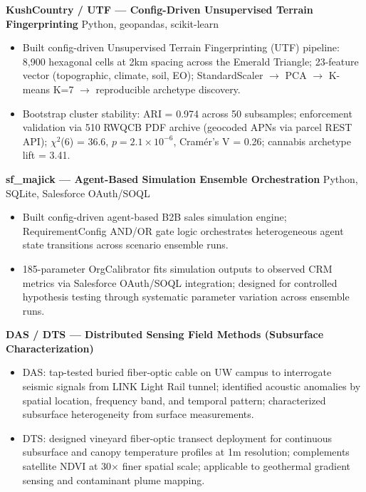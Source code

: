 \documentclass[11pt,a4paper]{article}
\begin{document}
\vspace{0.2cm}
\noindent
\textbf{KushCountry / UTF --- Config-Driven Unsupervised Terrain Fingerprinting} \hfill Python, geopandas, scikit-learn
\begin{itemize}
    \item Built config-driven Unsupervised Terrain Fingerprinting (UTF) pipeline: 8,900 hexagonal cells at 2km spacing across the Emerald Triangle; 23-feature vector (topographic, climate, soil, EO); StandardScaler $\rightarrow$ PCA $\rightarrow$ K-means K=7 $\rightarrow$ reproducible archetype discovery.
    \item Bootstrap cluster stability: ARI = 0.974 across 50 subsamples; enforcement validation via 510 RWQCB PDF archive (geocoded APNs via parcel REST API); $\chi^2$(6) = 36.6, $p = 2.1 \times 10^{-6}$, Cram\'er's V = 0.26; cannabis archetype lift = 3.41.
\end{itemize}

\vspace{0.2cm}
\noindent
\textbf{sf\_majick --- Agent-Based Simulation Ensemble Orchestration} \hfill Python, SQLite, Salesforce OAuth/SOQL
\begin{itemize}
    \item Built config-driven agent-based B2B sales simulation engine; RequirementConfig AND/OR gate logic orchestrates heterogeneous agent state transitions across scenario ensemble runs.
    \item 185-parameter OrgCalibrator fits simulation outputs to observed CRM metrics via Salesforce OAuth/SOQL integration; designed for controlled hypothesis testing through systematic parameter variation across ensemble runs.
\end{itemize}

\vspace{0.2cm}
\noindent
\textbf{DAS / DTS --- Distributed Sensing Field Methods (Subsurface Characterization)}
\begin{itemize}
    \item DAS: tap-tested buried fiber-optic cable on UW campus to interrogate seismic signals from LINK Light Rail tunnel; identified acoustic anomalies by spatial location, frequency band, and temporal pattern; characterized subsurface heterogeneity from surface measurements.
    \item DTS: designed vineyard fiber-optic transect deployment for continuous subsurface and canopy temperature profiles at 1m resolution; complements satellite NDVI at 30$\times$ finer spatial scale; applicable to geothermal gradient sensing and contaminant plume mapping.
\end{itemize}
\end{document}
